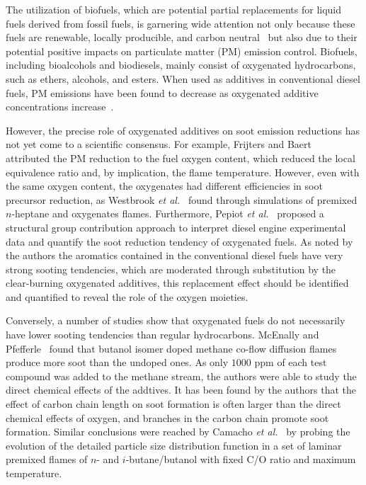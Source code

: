 \documentclass[review,3p,times]{elsarticleUS}
\begin{document}
The utilization of biofuels, which are potential partial replacements for liquid fuels derived from fossil fuels, is garnering wide attention not only because these fuels are renewable, locally producible, and carbon neutral~\cite{liu11} but also due to their potential positive impacts on particulate matter (PM) emission control. Biofuels, including bioalcohols and biodiesels, mainly consist of oxygenated hydrocarbons, such as ethers, alcohols, and esters. When used as additives in conventional diesel fuels, PM emissions have been found to decrease as oxygenated additive concentrations increase~\cite{graboski98}. 

However, the precise role of oxygenated additives on soot emission reductions has not yet come to a scientific consensus. For example, Frijters and Baert~\cite{frijters06} attributed the PM reduction to the fuel oxygen content, which reduced the local equivalence ratio and, by implication, the flame temperature.  However, even with the same oxygen content, the oxygenates had different efficiencies in soot precursor reduction, as Westbrook \emph{et al.}~\cite{westbrook06} found through simulations of premixed $n$-heptane and oxygenates flames.  Furthermore, Pepiot \emph{et al.}~\cite{pepiot08} proposed a structural group contribution approach to interpret diesel engine experimental data and quantify the soot reduction tendency of oxygenated fuels.  As noted by the authors the aromatics contained in the conventional diesel fuels have very strong sooting tendencies, which are moderated through substitution by the clear-burning oxygenated additives, this replacement effect should be identified and quantified to reveal the role of the oxygen moieties. 

Conversely, a number of studies show that oxygenated fuels do not necessarily have lower sooting tendencies than regular hydrocarbons.  McEnally and Pfefferle~\cite{mcenally05,mcenally11} found that butanol isomer doped methane co-flow diffusion flames produce more soot than the undoped ones.  As only $1000$ ppm of each test compound was added to the methane stream, the authors were able to study the direct chemical effects of the addtives.  It has been found by the authors that the effect of carbon chain length on soot formation is often larger than the direct chemical effects of oxygen, and branches in the carbon chain promote soot formation.  Similar conclusions were reached by Camacho \emph{et al.}~\cite{camacho13} by probing the evolution of the detailed particle size distribution function in a set of laminar premixed flames of $n$- and $i$-butane/butanol with fixed C/O ratio and maximum temperature. 
\end{document}
